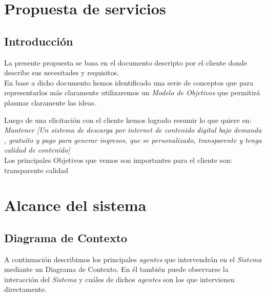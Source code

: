 \documentclass[11pt, a4paper, spanish]{article}
\newenvironment{borde}[1]
{\begin{lrbox}{\fmbox}\begin{minipage}{#1}}
{\end{minipage}\end{lrbox}\fbox{\usebox{\fmbox}}\\[10pt]}
\begin{document}
	



\section{Propuesta de servicios}
\label{sec:Propuesta de servicios}

\subsection{Introducci\'on}

	La presente propuesta se basa en el documento descripto por el cliente donde describe sus necesitades y requisitos.\\

	En base a dicho documento hemos identificado una serie de conceptos que para representarlos m\'as claramente utilizaremos un \emph{Modelo de Objetivos} que permitir\'a plasmar claramente las ideas.

	Luego de una elicitaci\'on con el cliente hemos logrado resumir lo que quiere en: \\

	\emph{Mantener [Un sistema de descarga por internet de contenido digital bajo demanda , gratuito y pago para generar ingresos, que se personalizado, transparente y tenga calidad de contenido]}
	\\
	Los principales Objetivos que vemos son importantes para el cliente son:\\
	transparente
	calidad

\newpage
	
\section{Alcance del sistema}

\subsection{Diagrama de Contexto}

	A continuaci\'on describimos los principales \emph{agentes} que intervendr\'an en el \emph{Sistema} mediante un Diagrama de Contexto.
	En \'el tambi\'en puede observarse la interacci\'on del \emph{Sistema} y cu\'ales de dichos \emph{agentes} son los que intervienen directamente.
\end{document}
